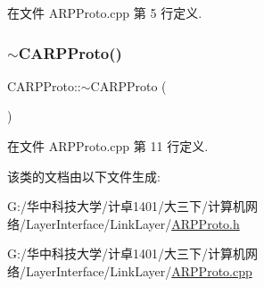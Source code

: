 在文件 A\+R\+P\+Proto.\+cpp 第 5 行定义.

\mbox{\label{class_c_a_r_p_proto_afe219000052d79aa6b7ee0b2866bc703}} 
\subsubsection{\texorpdfstring{$\sim$\+C\+A\+R\+P\+Proto()}{~CARPProto()}}
{\footnotesize\ttfamily C\+A\+R\+P\+Proto\+::$\sim$\+C\+A\+R\+P\+Proto (\begin{DoxyParamCaption}{ }\end{DoxyParamCaption})}



在文件 A\+R\+P\+Proto.\+cpp 第 11 行定义.



该类的文档由以下文件生成\+:\begin{DoxyCompactItemize}
\item 
G\+:/华中科技大学/计卓1401/大三下/计算机网络/\+Layer\+Interface/\+Link\+Layer/\hyperlink{_a_r_p_proto_8h}{A\+R\+P\+Proto.\+h}\item 
G\+:/华中科技大学/计卓1401/大三下/计算机网络/\+Layer\+Interface/\+Link\+Layer/\hyperlink{_a_r_p_proto_8cpp}{A\+R\+P\+Proto.\+cpp}\end{DoxyCompactItemize}

